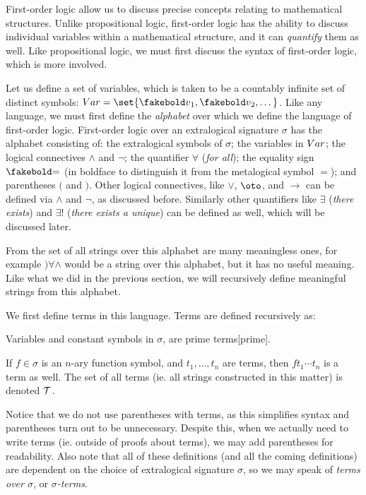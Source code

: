 First-order logic allow us to discuss precise concepts relating to mathematical structures.
Unlike propositional logic, first-order logic has the ability to discuss individual variables within a mathematical structure, and it can {\it quantify} them as well.
Like propositional logic, we must first discuss the syntax of first-order logic, which is more involved.

Let us define a set of variables, which is taken to be a countably infinite set of distinct symbols: $\Var=\set{\v_1,\v_2,\dots}$.
Like any language, we must first define the {\it alphabet} over which we define the language of first-order logic.
First-order logic over an extralogical signature $\sigma$ has the alphabet consisting of: the extralogical symbols of $\sigma$; the variables in ${\sl Var}$; the logical connectives $\land$ and $\neg$;
the quantifier $\forall$ ({\it for all}); the equality sign $\eq$ (in boldface to distinguish it from the metalogical symbol $=$); and parentheses $($ and $)$.
Other logical connectives, like $\lor$, $\oto$, and $\to$ can be defined via $\land$ and $\neg$, as discussed before.
Similarly other quantifiers like $\exists$ ({\it there exists}) and $\exists!$ ({\it there exists a unique}) can be defined as well, which will be discussed later.

From the set of all strings over this alphabet are many meaningless ones, for example $)\forall\land$ would be a string over this alphabet, but it has no useful meaning.
Like what we did in the previous section, we will recursively define meaningful strings from this alphabet.

\bdefn

    We first define {\emphcolor terms} in this language.
    Terms are defined recursively as:
    \benum
        \item Variables and constant symbols in $\sigma$, are {\emphcolor prime terms}[prime].
        \item If $f\in\sigma$ is an $n$-ary function symbol, and $t_1,\dots,t_n$ are terms, then $ft_1\cdots t_n$ is a term as well.
    \eenum
    The set of all terms (ie. all strings constructed in this matter) is denoted ${\cal T}$.

\edefn

Notice that we do not use parentheses with terms, as this simplifies syntax and parentheses turn out to be unnecessary.
Despite this, when we actually need to write terms (ie. outside of proofs about terms), we may add parentheses for readability.
Also note that all of these definitions (and all the coming definitions) are dependent on the choice of extralogical signature $\sigma$, so we may speak of {\it terms over $\sigma$}, or {\it $\sigma$-terms}.

